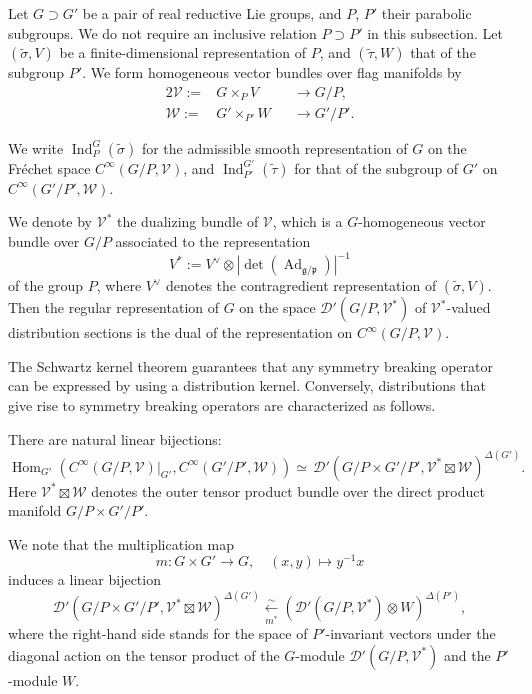 Let $G \supset G'$ be a pair of real reductive Lie groups, 
 and $P$, $P'$ their parabolic subgroups.  
We do not require an inclusive relation $P \supset P'$ in this subsection.  
Let $(\widetilde \sigma,V)$ be a finite-dimensional representation of $P$, 
 and $(\widetilde \tau,W)$ that of the subgroup $P'$.  
We form homogeneous vector bundles
 over flag manifolds
 by 
\begin{alignat*}{2}
{\mathcal{V}}:=& G \times_P V &&\to G/P, 
\\
{\mathcal{W}}:=& G' \times_{P'} W &&\to G'/P'.   
\end{alignat*}


We write ${\operatorname{Ind}}_P^G(\widetilde \sigma)$
 for the admissible smooth representation 
 of $G$ on the Fr{\'e}chet space $C^{\infty}(G/P,{\mathcal{V}})$, 
 and ${\operatorname{Ind}}_{P'}^{G'}(\widetilde \tau)$
 for that of the subgroup of $G'$ on $C^{\infty}(G'/P',{\mathcal{W}})$.  



We denote by ${\mathcal{V}}^{\ast}$ 
 the dualizing bundle of ${\mathcal{V}}$, 
 which is a $G$-homogeneous vector bundle over $G/P$ 
 associated to the representation
\[
   V^{\ast}:=V^{\vee} \otimes |\det ({\operatorname{Ad}}_{{\mathfrak{g}}/{\mathfrak{p}}})|^{-1}
\]
 of the group $P$, 
where $V^{\vee}$ denotes the contragredient representation
 of $(\widetilde \sigma,V)$.  
Then the regular representation of $G$
 on the space ${\mathcal{D}}'(G/P, {\mathcal{V}}^{\ast})$
 of ${\mathcal{V}}^{\ast}$-valued distribution sections
 is the dual of the representation on $C^{\infty}(G/P, {\mathcal{V}})$.  



The Schwartz kernel theorem guarantees 
 that any symmetry breaking operator can be expressed
 by using a distribution kernel.  
Conversely,
 distributions that give rise to symmetry breaking operators
 are characterized as follows.  
\begin{fact}
\label{fact:SBOdistr}
There are natural linear bijections:
\[
{\operatorname{Hom}}_{G'}
 (C^{\infty}(G/P, {\mathcal{V}})|_{G'}, 
  C^{\infty}(G'/P', {\mathcal{W}}))
\simeq\,  {\mathcal{D}}'(G/P \times G'/P', {\mathcal{V}}^{\ast} \boxtimes {\mathcal{W}}
)^{\Delta(G')}.  
\]
Here ${\mathcal{V}}^{\ast} \boxtimes {\mathcal{W}}$ denotes
 the outer tensor product bundle 
 over the direct product manifold $G/P \times G'/P'$.  
\end{fact}
We note that the multiplication map
\[
  m \colon G \times G' \to G, 
\quad
  (x,y) \mapsto y^{-1} x
\]
 induces a linear bijection
\[
{\mathcal{D}}'(G/P \times G'/P',
  {\mathcal{V}}^{\ast} \boxtimes {\mathcal{W}})
^{\Delta(G')}
\underset{m^{\ast}}{\overset \sim \leftarrow}
({\mathcal{D}}'(G/P, {\mathcal{V}}^{\ast}) \otimes W)^{\Delta(P')}, 
\]
where
 the right-hand side stands for the space
 of $P'$-invariant vectors
 under the diagonal action
 on the tensor product of the $G$-module
 ${\mathcal{D}}'(G/P, 
  {\mathcal{V}}^{\ast})$
 and the $P'$-module $W$.  



